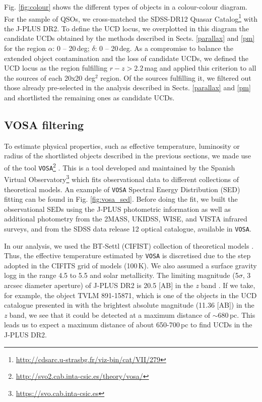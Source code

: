 Fig. \ref{fig:colour} shows the different types of objects in a colour-colour diagram. For the sample of QSOs, we cross-matched the SDSS-DR12 Quasar Catalog\footnote{\url{http://cdsarc.u-strasbg.fr/viz-bin/cat/VII/279}} with the J-PLUS DR2. To define the UCD locus, we overplotted in this diagram the candidate UCDs obtained by the methods described in Sects. \ref{parallax} and \ref{pm} for the region $\alpha$: 0 -- 20\,deg; $\delta$: 0 -- 20\,deg. As a compromise to balance the extended object contamination and the loss of candidate UCDs, we defined the UCD locus as the region fulfilling $\textit{r}-\textit{z} > 2.2$\,mag and applied this criterion to all the sources of each 20x20 deg$^2$ region. Of the sources fulfilling it, we filtered out those already pre-selected in the analysis described in Sects. \ref{parallax} and \ref{pm} and shortlisted the remaining ones as candidate UCDs.


\subsection{VOSA filtering} \label{vosa}

To estimate physical properties, such as effective temperature, luminosity or radius of the shortlisted objects described in the previous sections, we made use of the tool \texttt{VOSA}\footnote{\url{http://svo2.cab.inta-csic.es/theory/vosa/}} \citep{vosa}. This is a tool developed and maintained by the Spanish Virtual Observatory\footnote{\url{https://svo.cab.inta-csic.es}} which fits observational data to different collections of theoretical models. An example of \texttt{VOSA} Spectral Energy Distribution (SED) fitting can be found in Fig. \ref{fig:vosa_sed}. Before doing the fit, we built the observational SEDs using the J-PLUS photometric information as well as additional photometry from the 2MASS, UKIDSS, WISE, and VISTA infrared surveys, and from the SDSS data release 12 optical catalogue, available in \texttt{VOSA}.


In our analysis, we used the BT-Settl (CIFIST) collection of theoretical models \citep{allard2012, caffau2011}. Thus, the effective temperature estimated by \texttt{VOSA} is discretised due to the step adopted in the CIFITS grid of models (100\,K). We also assumed a surface gravity logg in the range 4.5 to 5.5 and solar metallicity. The limiting magnitude (5$\sigma$, 3\,arcsec diameter aperture) of J-PLUS DR2 is 20.5 [AB] in the \textit{z} band \citep{jpluscal}. If we take, for example, the object TVLM 891-15871, which is one of the objects in the UCD catalogue presented in \citet{Reyle2018} with the brightest absolute magnitude (11.36 [AB]) in the \textit{z} band, we see that it could be detected at a maximum distance of $\sim$680\,pc. This leads us to expect a maximum distance of about 650-700\,pc to find UCDs in the J-PLUS DR2.

